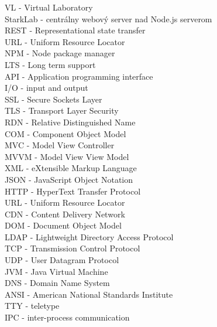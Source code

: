 VL - Virtual Laboratory\\
StarkLab - centrálny webový server nad Node.js serverom\\
REST - Representational state transfer\\
URL - Uniform Resource Locator\\
NPM - Node package manager\\
LTS - Long term support\\
API - Application programming interface\\
I/O - input and output\\
SSL - Secure Sockets Layer\\
TLS - Transport Layer Security\\
RDN - Relative Distinguished Name\\
COM - Component Object Model\\
MVC - Model View Controller\\
MVVM - Model View View Model\\
XML - eXtensible Markup Language\\
JSON - JavaScript Object Notation\\
HTTP - HyperText Transfer Protocol\\
URL - Uniform Resource Locator\\
CDN - Content Delivery Network\\
DOM - Document Object Model\\
LDAP - Lightweight Directory Access Protocol\\
TCP - Transmission Control Protocol\\
UDP - User Datagram Protocol\\
JVM - Java Virtual Machine\\
DNS - Domain Name System\\
ANSI - American National Standards Institute\\
TTY - teletype\\
IPC - inter-process communication\\

